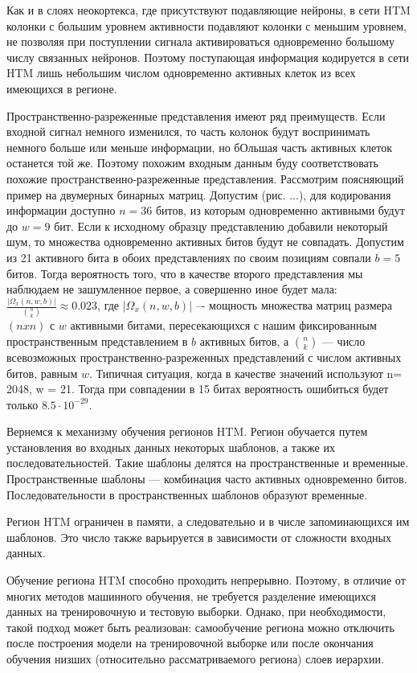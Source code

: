 Как и в слоях неокортекса, где присутствуют подавляющие нейроны, в сети HTM колонки с большим уровнем активности подавляют колонки с меньшим уровнем, не позволяя при поступлении сигнала активироваться одновременно большому числу связанных нейронов. Поэтому поступающая информация кодируется в сети HTM лишь небольшим числом одновременно активных клеток из всех имеющихся в регионе. 

Пространственно-разреженные представления имеют ряд преимуществ. Если входной сигнал немного изменился, то часть колонок будут воспринимать немного больше или меньше информации, но бОльшая часть активных клеток останется той же. Поэтому похожим входным данным буду соответствовать похожие пространственно-разреженные представления. Рассмотрим поясняющий  пример на двумерных бинарных матриц. Допустим (рис. ...), для кодирования информации доступно $n = 36$ битов, из которым одновременно активными будут до $w = 9$ бит. Если к исходному образцу представлению добавили некоторый шум, то множества одновременно активных битов будут не совпадать. Допустим из 21 активного бита в обоих представлениях по своим позициям совпали $b = 5$ битов. Тогда вероятность того, что  в качестве второго представления мы наблюдаем не зашумленное первое, а совершенно иное будет мала: $\frac{|\Omega_x (n,w,b)| }{\binom nk} \approx 0.023$, где  $|\Omega_x (n,w,b)|$ –- мощность множества матриц размера $(n x n)$ с $w$ активными битами, пересекающихся с нашим фиксированным пространственным представлением в $b$ активных битов, а ${\binom nk}$ --- число всевозможных пространственно-разреженных представлений с числом активных битов, равным $w$. 
Типичная ситуация, когда в качестве значений используют n= 2048, w = 21. Тогда при совпадении в 15 битах вероятность ошибиться будет только  $8.5 \cdot 10^{-29}$.  

Вернемся к механизму обучения регионов HTM. Регион обучается путем установления во входных данных некоторых шаблонов, а также их последовательностей. Такие шаблоны делятся на пространственные и временные. Пространственные шаблоны --- комбинация часто активных одновременно битов. Последовательности в пространственных шаблонов образуют временные. 

Регион HTM ограничен в памяти, а следовательно и в числе запоминающихся им шаблонов. Это число также варьируется в зависимости от сложности входных данных.

Обучение региона HTM способно проходить непрерывно. Поэтому, в отличие от многих методов машинного обучения, не  требуется разделение имеющихся данных на тренировочную и тестовую выборки. Однако, при необходимости, такой подход может быть реализован: самообучение региона можно отключить после построения модели на тренировочной выборке или после окончания обучения низших (относительно рассматриваемого региона) слоев иерархии.
 
